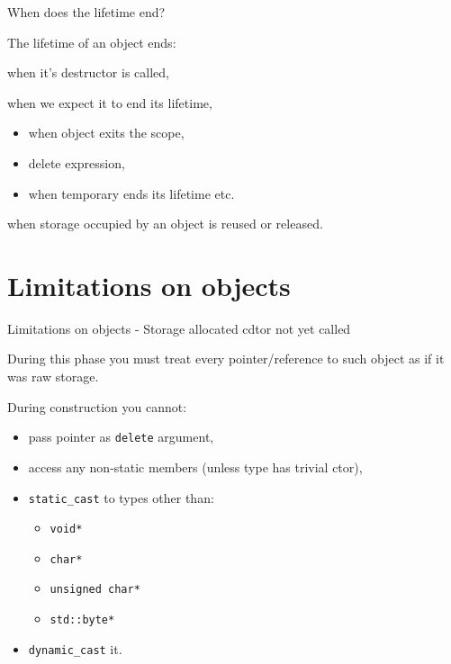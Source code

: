 \documentclass{panicsoftware-presentation}
\makeatletter
\newenvironment{itemizeSeq}{\begin{itemize}[<+-|alert@+>]}{\end{itemize}}
\makeatother
\begin{document}
\begin{frame}{When does the lifetime end?}

\centerline{The lifetime of an object \alert{ends}:}

\begin{description}[<+-|alert@+>]

\item[class types] when it's destructor is called,
\item[non-class types] when we expect it to end its lifetime, 
\begin{itemize}
	\item when object exits the scope,
	\item delete expression,
	\item when temporary ends its lifetime etc.
\end{itemize}
\item[any type] when storage occupied by an object is reused or released.
\end{description}

\end{frame}

\section*{Limitations on objects}

\begin{frame}{Limitations on objects - Storage allocated cdtor not yet called}

During this phase you must treat every pointer/reference to such object as if it was raw storage.

During construction you cannot:
\begin{itemizeSeq}
	\item pass pointer as \texttt{delete} argument,
	\item access any non-static members (unless type has trivial ctor),
	\item \texttt{static\_cast} to types other than:
	\begin{itemize}
		\item \texttt{void*}
		\item \texttt{char*}
		\item \texttt{unsigned char*}
		\item \texttt{std::byte*}
	\end{itemize} 
	\item \texttt{dynamic\_cast} it.
\end{itemizeSeq}

\end{frame}
\end{document}
